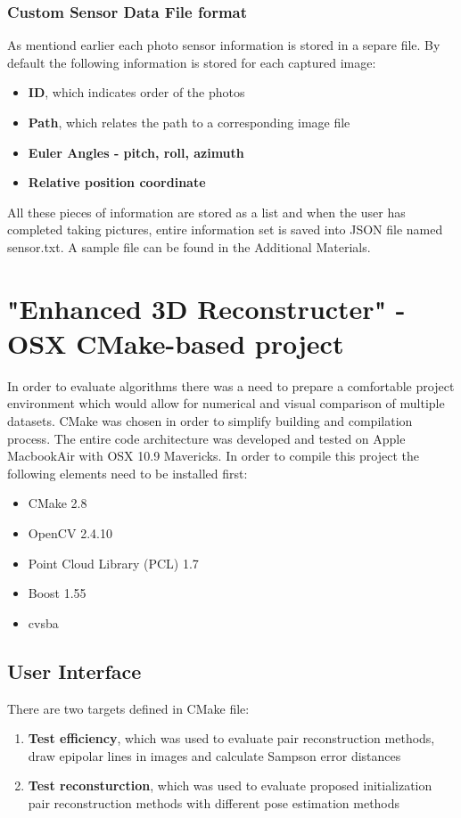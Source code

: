 \subsubsection{Custom Sensor Data File format}
As mentiond earlier each photo sensor information is stored in a separe file. By default the following information is stored for each captured image:
\begin{itemize}
\item \textbf{ID}, which indicates order of the photos
\item \textbf{Path}, which relates the path to a corresponding image file
\item \textbf{Euler Angles - pitch, roll, azimuth}
\item \textbf{Relative position coordinate}
\end{itemize} 
All these pieces of information are stored as a list and when the user has completed taking pictures, entire information set is saved into JSON file named sensor.txt. A sample file can be found in the Additional Materials.

\section{"Enhanced 3D Reconstructer" - OSX CMake-based project}
In order to evaluate algorithms there was a need to prepare a comfortable project environment which would allow for numerical and visual comparison of multiple datasets. CMake was chosen in order to simplify building and compilation process. The entire code architecture was developed and tested on Apple MacbookAir with OSX 10.9 Mavericks. In order to compile this project the following elements need to be installed first:
\begin{itemize}
\item CMake 2.8
\item OpenCV 2.4.10
\item Point Cloud Library (PCL) 1.7 \cite{website:pcl}
\item Boost 1.55
\item cvsba \cite{website:cvsba}
\end{itemize}
\subsection{User Interface}
There are two targets defined in CMake file:
\begin{enumerate}
\item \textbf{Test efficiency}, which was used to evaluate pair reconstruction methods, draw epipolar lines in images and calculate Sampson error distances
\item \textbf{Test reconsturction}, which was used to evaluate proposed initialization pair reconstruction methods with different pose estimation methods
\end{enumerate}
